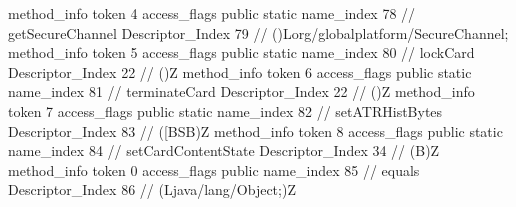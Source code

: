 {{{{{				}
				method_info {
					token	4
					access_flags	public static
					name_index	78		// getSecureChannel
					Descriptor_Index	79		// ()Lorg/globalplatform/SecureChannel;
				}
				method_info {
					token	5
					access_flags	public static
					name_index	80		// lockCard
					Descriptor_Index	22		// ()Z
				}
				method_info {
					token	6
					access_flags	public static
					name_index	81		// terminateCard
					Descriptor_Index	22		// ()Z
				}
				method_info {
					token	7
					access_flags	public static
					name_index	82		// setATRHistBytes
					Descriptor_Index	83		// ([BSB)Z
				}
				method_info {
					token	8
					access_flags	public static
					name_index	84		// setCardContentState
					Descriptor_Index	34		// (B)Z
				}
				method_info {
					token	0
					access_flags	public
					name_index	85		// equals
					Descriptor_Index	86		// (Ljava/lang/Object;)Z
				}
			}
		}
	}
}
